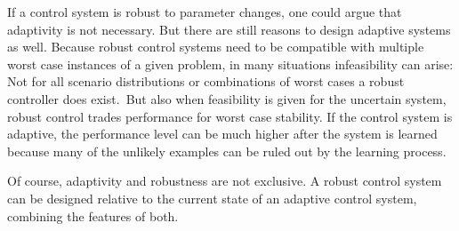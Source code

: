 If a control system is robust to parameter changes, one could argue that
adaptivity is not necessary. But there are still reasons to design adaptive
systems as well. Because robust control systems need to be compatible with
multiple worst case instances of a given problem, in many situations
infeasibility can arise: Not for all scenario distributions or combinations of
worst cases a robust controller does
exist.~\cite{Calafiore.Campi:2006:Scenario}\iss But also when feasibility is
given for the uncertain system, robust control trades performance for worst case
stability. If the control system is adaptive, the performance level can be much
higher after the system is learned because many of the unlikely examples can be
ruled out by the learning process.

Of course, adaptivity and robustness are not exclusive. A robust control system
can be designed relative to the current state of an adaptive control system,
combining the features of both.~\cite{Ioannou.Sun:1996:Robust}

